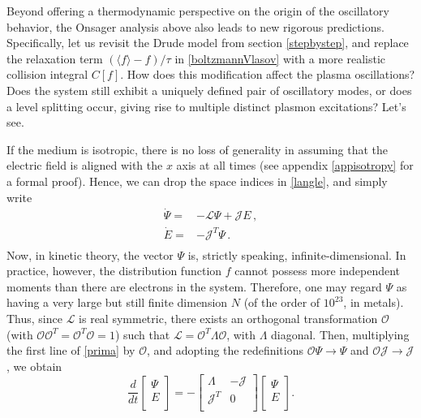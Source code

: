 \documentclass[a4paper, amsfonts, amssymb, amsmath, reprint, showkeys, nofootinbib, twoside,notitlepage,onecolumn]{revtex4-1}
\theoremstyle{definition}
\theoremstyle{theorem}
\begin{document}
Beyond offering a thermodynamic perspective on the origin of the oscillatory behavior, the Onsager analysis above also leads to new rigorous predictions. Specifically, let us revisit the Drude model from section \ref{stepbystep}, and replace the relaxation term $(\langle f \rangle {-} f)/\tau$ in \eqref{boltzmannVlasov} with a more realistic collision integral $C[f]$. How does this modification affect the plasma oscillations? Does the system still exhibit a uniquely defined pair of oscillatory modes, or does a level splitting occur, giving rise to multiple distinct plasmon excitations? Let's see.

If the medium is isotropic, there is no loss of generality in assuming that the electric field is aligned with the $x$ axis at all times (see appendix \ref{appisotropy} for a formal proof). Hence, we can drop the space indices in \eqref{langle}, and simply write
\begin{equation}\label{prima}
\begin{split}
\Dot{\Psi}={}& -\mathcal{L}\Psi +\mathcal{J} E\, , \\
\Dot{E} ={}&-\mathcal{J}^T\Psi \, . \\
\end{split}
\end{equation}
Now, in kinetic theory, the vector $\Psi$ is, strictly speaking, infinite-dimensional. In practice, however, the distribution function $f$ cannot possess more independent moments than there are electrons in the system. Therefore, one may regard $\Psi$ as having a very large but still finite dimension $N$ (of the order of $10^{23}$, in metals). Thus, since $\mathcal{L}$ is real symmetric, there exists an orthogonal transformation $\mathcal{O}$ (with $\mathcal{O}\mathcal{O}^T{=}\mathcal{O}^T \mathcal{O}{=}1$) such that
$\mathcal{L}{=}\mathcal{O}^T \Lambda \mathcal{O}$, with $\Lambda$ diagonal. Then, multiplying the first line of \eqref{prima} by $\mathcal{O}$, and adopting the redefinitions 
$\mathcal{O}\Psi\rightarrow \Psi$ and $\mathcal{O}\mathcal{J}\rightarrow \mathcal{J}$, we obtain
\begin{equation}\label{dopo}
\dfrac{d}{dt}
\begin{bmatrix}
\Psi\\
E\\
\end{bmatrix}
=-
\left[\begin{array}{c|c}
\Lambda & -\mathcal{J} \\
\hline
\mathcal{J}^T & 0 \\
\end{array}\right]
\begin{bmatrix}
\Psi\\
E\\
\end{bmatrix}.
\end{equation}
\end{document}
